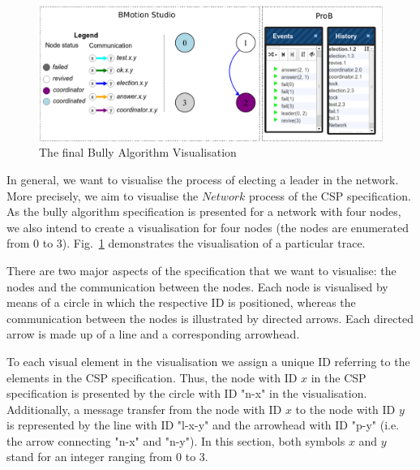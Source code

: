 \begin{figure}[h!]\centering
	\includegraphics[width=16cm]{img/tutorial/runningvis}
	\caption{The final Bully Algorithm Visualisation}
	\label{fig:BullyVisState}
\end{figure}

In general, we want to visualise the process of electing a leader in the network.
More precisely, we aim to visualise the $Network$ process of the CSP specification.
As the bully algorithm specification is presented for a network with four nodes, we also intend to create a visualisation for four nodes (the nodes are enumerated from 0 to 3). 
Fig.~\ref{fig:BullyVisState} demonstrates the visualisation of a particular trace.

There are two major aspects of the specification that we want to visualise: the nodes and the communication between the nodes.
Each node is visualised by means of a circle in which the respective ID is positioned, whereas the communication between the nodes is illustrated by directed arrows.
Each directed arrow is made up of a line and a corresponding arrowhead.

To each visual element in the visualisation we assign a unique ID referring to the elements in the CSP specification.
Thus, the node with ID $x$ in the CSP specification is presented by the circle with ID "n-x" in the visualisation.
Additionally, a message transfer from the node with ID $x$ to the node with ID $y$ is represented by the line with ID "l-x-y" and the arrowhead with ID "p-y" (i.e. the arrow connecting "n-x" and "n-y").
In this section, both symbols $x$ and $y$ stand for an integer ranging from 0 to 3.

